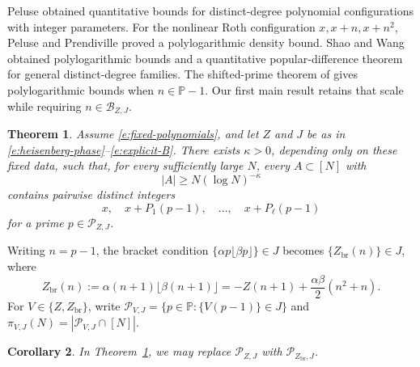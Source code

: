 \documentclass[12pt]{amsart}
\newcommand{\1}{\mathbf 1}
\newtheorem{theorem}{Theorem}[section]
\newtheorem{corollary}[theorem]{Corollary}
\theoremstyle{definition}
\begin{document}
\bigskip

Peluse \cite{Peluse} obtained quantitative bounds for
distinct-degree polynomial configurations with integer
parameters. For the nonlinear Roth configuration $x,x+n,x+n^2$,
Peluse and Prendiville \cite{PP} proved a polylogarithmic
density bound. Shao and Wang \cite{ShaoWang} obtained
polylogarithmic bounds and a quantitative popular-difference
theorem for general distinct-degree families.
The shifted-prime theorem of \cite{KMTT} gives polylogarithmic
bounds when $n\in\mathbb P-1$. Our first main result retains
that scale while requiring $n\in\mathcal B_{Z,J}$.


\begin{theorem}\label{t:recurrence}
 Assume \eqref{e:fixed-polynomials}, and let $Z$ and $J$ be as in
 \eqref{e:heisenberg-phase}--\eqref{e:explicit-B}. There exists
 $\kappa>0$, depending only on these fixed data, such that, for every
 sufficiently large $N$, every $A\subset[N]$ with
 \[
  |A|\geq N(\log N)^{-\kappa}
 \]
 contains pairwise distinct integers
 \[
  x,\quad x+P_1(p-1),\quad\ldots,\quad x+P_\ell(p-1)
 \]
 for a prime $p\in\mathcal P_{Z,J}$.
\end{theorem}
Writing $n=p-1$, the bracket condition
$\{\alpha p\lfloor\beta p\rfloor\}\in J$ becomes
$\{Z_{\mathrm{br}}(n)\}\in J$, where
\begin{equation}\label{e:bracket-phase}
 Z_{\mathrm{br}}(n)
 :=\alpha(n+1)\lfloor\beta(n+1)\rfloor
 =-Z(n+1)+\frac{\alpha\beta}{2}(n^2+n).
\end{equation}
For $V\in\{Z,Z_{\mathrm{br}}\}$, write
$\mathcal P_{V,J}=\{p\in\mathbb P:\{V(p-1)\}\in J\}$ and
$\pi_{V,J}(N)=|\mathcal P_{V,J}\cap[N]|$.

\begin{corollary}\label{c:bracket-recurrence}
In Theorem~\ref{t:recurrence}, we may replace
$\mathcal P_{Z,J}$ with $\mathcal P_{Z_{\mathrm{br}},J}$.
\end{corollary}
\end{document}
